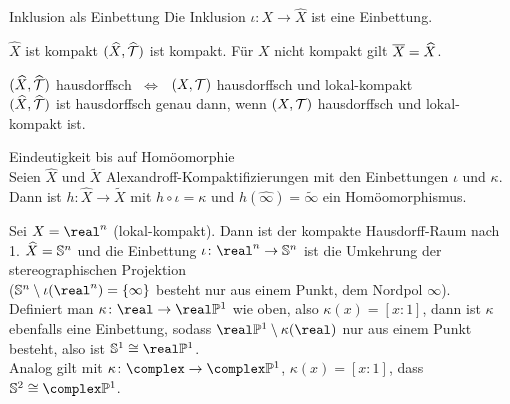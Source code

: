 \begin{Lemma}{Inklusion als Einbettung}
    Die Inklusion $\iota\colon X \rightarrow \widehat{X}$ ist eine Einbettung.
\end{Lemma}

\begin{Lemma}{$\widehat{X}$ ist kompakt}
    $(\widehat{X}, \widehat{\mathcal{T}})$ ist kompakt.
    Für $X$ nicht kompakt gilt $\overline{X} = \widehat{X}$.
\end{Lemma}

\begin{Lemma}{$(\widehat{X}, \widehat{\mathcal{T}})$ hausdorffsch $\;\Leftrightarrow\;$
              $(X, \mathcal{T})$ hausdorffsch und lokal-kompakt}\\
    $(\widehat{X}, \widehat{\mathcal{T}})$ ist hausdorffsch genau dann, wenn
    $(X, \mathcal{T})$ hausdorffsch und lokal-kompakt ist.
\end{Lemma}

\begin{Lemma}{Eindeutigkeit bis auf Homöomorphie}\\
    Seien $\widehat{X}$ und $\widetilde{X}$ Alexandroff-Kompaktifizierungen
    mit den Einbettungen $\iota$ und $\kappa$. \\
    Dann ist
    $h\colon \widehat{X} \rightarrow \widetilde{X}$
    mit $h \circ \iota = \kappa$ und
    $h(\widehat{\infty}) = \widetilde{\infty}$ ein Homöomorphismus.
\end{Lemma}

\linie
\pagebreak

\begin{Bsp}
    Sei $X = \real^n$ (lokal-kompakt).
    Dann ist der kompakte Hausdorff-Raum nach 1. $\widehat{X} = \mathbb{S}^n$
    und die Einbettung $\iota\colon \real^n \rightarrow \sphere^n$
    ist die Umkehrung der stereographischen Projektion \\
    ($\sphere^n \setminus \iota(\real^n) = \{\infty\}$ besteht nur aus
    einem Punkt, dem Nordpol $\infty$). \\
    Definiert man $\kappa\colon \real \rightarrow \real\projective^1$
    wie oben, also $\kappa(x) = [x:1]$,
    dann ist $\kappa$ ebenfalls eine Einbettung, sodass
    $\real\projective^1 \setminus \kappa(\real)$ nur aus einem Punkt besteht,
    also ist $\sphere^1 \cong \real\projective^1$. \\
    Analog gilt mit $\kappa\colon \complex \rightarrow \complex\projective^1$,
    $\kappa(x) = [x:1]$, dass
    $\sphere^2 \cong \complex\projective^1$.
\end{Bsp}

